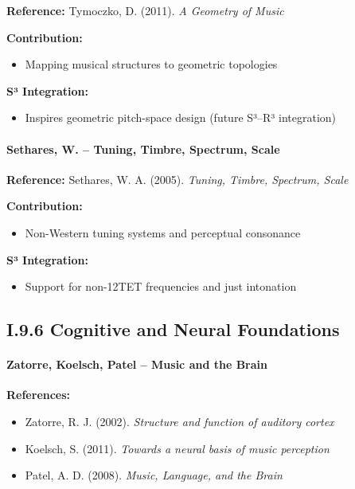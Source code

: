 \textbf{Reference:} Tymoczko, D. (2011). \textit{A Geometry of Music}

\textbf{Contribution:}

\begin{itemize}
    \item Mapping musical structures to geometric topologies
\end{itemize}

\textbf{S³ Integration:}

\begin{itemize}
    \item Inspires geometric pitch-space design (future S³–R³ integration)
\end{itemize}

\paragraph{Sethares, W. – Tuning, Timbre, Spectrum, Scale}

\textbf{Reference:} Sethares, W. A. (2005). \textit{Tuning, Timbre, Spectrum, Scale}

\textbf{Contribution:}

\begin{itemize}
    \item Non-Western tuning systems and perceptual consonance
\end{itemize}

\textbf{S³ Integration:}

\begin{itemize}
    \item Support for non-12TET frequencies and just intonation
\end{itemize}

\subsection*{I.9.6 Cognitive and Neural Foundations}

\paragraph{Zatorre, Koelsch, Patel – Music and the Brain}

\textbf{References:}

\begin{itemize}
    \item Zatorre, R. J. (2002). \textit{Structure and function of auditory cortex}
    \item Koelsch, S. (2011). \textit{Towards a neural basis of music perception}
    \item Patel, A. D. (2008). \textit{Music, Language, and the Brain}
\end{itemize}


